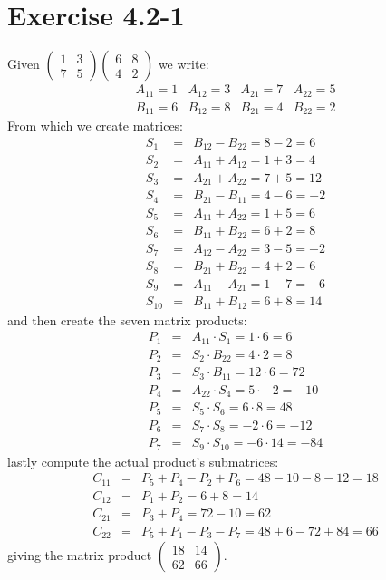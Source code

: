 \documentclass{article}
\begin{document}
\section*{Exercise 4.2-1}

Given $
\begin{pmatrix}
	1 & 3 \\
	7 & 5
\end{pmatrix}
\begin{pmatrix}
	6 & 8 \\
	4 & 2
\end{pmatrix}
$ we write:
\begin{equation*}
\begin{matrix}
	A_{11} = 1 & A_{12} = 3 & A_{21} = 7 & A_{22} = 5 \\
	B_{11} = 6 & B_{12} = 8 & B_{21} = 4 & B_{22} = 2
\end{matrix}
\end{equation*}
From which we create matrices:
\begin{eqnarray*}
	S_1 & = & B_{12} - B_{22} = 8 - 2 = 6 \\
	S_2 & = & A_{11} + A_{12} = 1 + 3 = 4 \\
	S_3 & = & A_{21} + A_{22} = 7 + 5 = 12 \\
	S_4 & = & B_{21} - B_{11} = 4 - 6 = -2 \\
	S_5 & = & A_{11} + A_{22} = 1 + 5 = 6 \\
	S_6 & = & B_{11} + B_{22} = 6 + 2 = 8 \\
	S_7 & = & A_{12} - A_{22} = 3 - 5 = -2 \\
	S_8 & = & B_{21} + B_{22} = 4 + 2 = 6 \\
	S_9 & = & A_{11} - A_{21} = 1 - 7 = -6 \\
	S_{10} & = & B_{11} + B_{12} = 6 + 8 = 14
\end{eqnarray*}
and then create the seven matrix products:
\begin{eqnarray*}
	P_1 & = & A_{11} \cdot S_1 = 1 \cdot 6 = 6 \\
	P_2 & = & S_2 \cdot B_{22} = 4 \cdot 2 = 8 \\
	P_3 & = & S_3 \cdot B_{11} = 12 \cdot 6 = 72 \\
	P_4 & = & A_{22} \cdot S_4 = 5 \cdot -2 = -10 \\
	P_5 & = & S_5 \cdot S_6 = 6 \cdot 8 = 48 \\
	P_6 & = & S_7 \cdot S_8 = -2 \cdot 6 = -12 \\
	P_7 & = & S_9 \cdot S_{10} = -6 \cdot 14 = -84
\end{eqnarray*}
lastly compute the actual product's submatrices:
\begin{eqnarray*}
	C_{11} & = & P_5 + P_4 - P_2 + P_6 = 48 - 10 - 8 - 12 = 18 \\
	C_{12} & = & P_1 + P_2 = 6 + 8 = 14 \\
	C_{21} & = & P_3 + P_4 = 72 - 10 = 62 \\
	C_{22} & = & P_5 + P_1 - P_3 -P_7 = 48 + 6 -72 + 84 = 66
\end{eqnarray*}
giving the matrix product $
\begin{pmatrix}
	18 & 14 \\
	62 & 66
\end{pmatrix}$.
\end{document}
